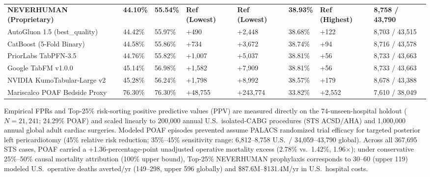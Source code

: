 \begin{table}[t]
\centering
\caption{}
\label{tab:fpr_impact}
\tablefont
\setlength{\tabcolsep}{2.9pt}
\begin{tabularx}{\textwidth}{@{}Y R{1.25cm} R{1.25cm} R{1.60cm} R{1.65cm} R{1.20cm} R{1.60cm} R{2.20cm}@{}}
\toprule
{} &  &  &  &  &  &  &  \\
\midrule
{}
\textbf{NEVERHUMAN (Proprietary)} & \textbf{44.10\%} & \textbf{55.54\%} & \textbf{Ref (Lowest)} & \textbf{Ref (Lowest)} & \textbf{38.93\%} & \textbf{Ref (Highest)} & \textbf{8,758 / 43,790} \\
AutoGluon 1.5 (best\_quality) & 44.42\% & 55.97\% & +490 & +2,448 & 38.68\% & +122 & 8,703 / 43,515 \\
CatBoost (5-Fold Binary) & 44.58\% & 55.86\% & +734 & +3,672 & 38.74\% & +94 & 8,716 / 43,578 \\
PriorLabs TabPFN-3.5 & 44.76\% & 55.82\% & +1,007 & +5,037 & 38.81\% & +56 & 8,733 / 43,663 \\
Google TabFM v1.0.0 & 45.14\% & 56.98\% & +1,582 & +7,909 & 38.81\% & +56 & 8,733 / 43,663 \\
NVIDIA KumoTabular-Large v2 & 45.28\% & 56.24\% & +1,798 & +8,992 & 38.57\% & +179 & 8,678 / 43,388 \\
Mariscalco POAF Bedside Proxy & 76.30\% & 76.30\% & +48,755 & +243,774 & 33.82\% & +2,552 & 7,610 / 38,049 \\
\bottomrule
\end{tabularx}
\vspace{2pt}
{\raggedright\sffamily\fontsize{6.75}{8.4}\selectfont\color{sub}Empirical FPRs and Top-25\% risk-sorting positive predictive values (PPV) are measured directly on the 74-unseen-hospital holdout ($N{=}21{,}241$; 24.29\% POAF) and scaled linearly to 200,000 annual U.S.\ isolated-CABG procedures (STS ACSD/AHA) and 1,000,000 annual global adult cardiac surgeries.\cite{vervoort2023global} Modeled POAF episodes prevented assume PALACS randomized trial efficacy for targeted posterior left pericardiotomy (45\% relative risk reduction; 35\%--45\% sensitivity range: 6,812--8,758 U.S.\ / 34,059--43,790 global).\cite{gaudino2021palacs} Across all 367,695 STS cases, POAF carried a +1.36-percentage-point unadjusted operative mortality excess (2.78\% vs.\ 1.42\%, 1.96$\times$); under conservative 25\%--50\% causal mortality attribution (100\% upper bound), Top-25\% NEVERHUMAN prophylaxis corresponds to 30--60 (upper 119) modeled U.S.\ operative deaths averted/yr (149--298, upper 596 globally) and \$87.6M--\$131.4M/yr in U.S.\ hospital costs.\cite{lapar2014poaf}\par}
\end{table}
